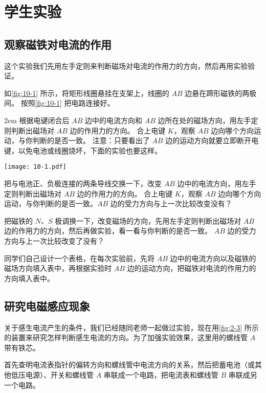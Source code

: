 \chapter*{学生实验}
\section{观察磁铁对电流的作用}
这个实验我们先用左手定则来判断磁场对电流的作用力的方向，然后再用实验验证。

如\cref{fig:10-1} 所示，将矩形线圈悬挂在支架上，线圈的 $AB$ 边悬在蹄形磁铁的两极间。
按照\cref{fig:10-1} 把电路连接好。

\medskip\noindent
\begin{minipage}{0.45\linewidth}\parindent2em
根据电键闭合后 $AB$ 边中的电流方向和 $AB$ 边所在处的磁场方向，用左手定则判断出磁场对 $AB$ 边的作用力的方向。
合上电键 $K$，观察 $AB$ 边向哪个方向运动，与你判断的是否一致。
注意：只要看出了 $AB$ 边的运动方向就要立即断开电键，以免电池或线圈烧坏，下面的实验也要这样。
\end{minipage}\hfill
\begin{minipage}{0.5\linewidth}\centering
  \begin{figurehere}
    \texttt{[image: 10-1.pdf]}
    \caption{}\label{fig:10-1}
  \end{figurehere}
\end{minipage}

\medskip
把与电池正、负极连接的两条导线交换一下，改变 $AB$ 边中的电流方向，用左手定则判断出磁场对 $AB$ 边的作用力的方向。
合上电键 $K$，观察 $AB$ 边向哪个方向运动，与你判断的是否一致。$AB$ 边的受力方向与上一次比较改变没有？

把磁铁的 $N$、$S$ 极调换一下，改变磁场的方向，先用左手定则判断出磁场对 $AB$ 边的作用力的方向，然后再做实验，看一看与你判断的是否一致。
$AB$ 边的受力方向与上一次比较改变了没有？

同学们自己设计一个表格，在每次实验前，先将 $AB$ 边中的电流方向以及磁铁的磁场方向填入表中，再根据实验时 $AB$ 边的运动方向，把磁铁对电流的作用力的方向填入表中。

\section{研究电磁感应现象}
关于感生电流产生的条件，我们已经随同老师一起做过实验，现在用\cref{fig:2-3} 所示的装置来研究怎样判断感生电流的方向。为了加强实验效果，这里用的螺线管 $A$ 带有铁芯。

首先查明电流表指针的偏转方向和螺线管中电流方向的关系，然后把蓄电池（或其他低压电源）、开关和螺线管 $A$ 串联成一个电路，把电流表和螺线管 $B$ 串联成另一个电路。

